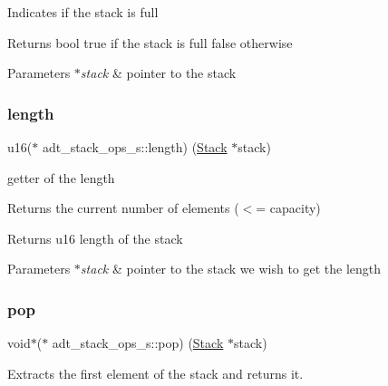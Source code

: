 Indicates if the stack is full

\begin{DoxyReturn}{Returns}
bool true if the stack is full false otherwise 
\end{DoxyReturn}

\begin{DoxyParams}{Parameters}
{\em $\ast$stack} & pointer to the stack \\
\hline
\end{DoxyParams}
\mbox{\label{structadt__stack__ops__s_ae77aa49422bbfe038dd3f9eb93e14882}} 
\subsubsection{\texorpdfstring{length}{length}}
{\footnotesize\ttfamily u16($\ast$ adt\+\_\+stack\+\_\+ops\+\_\+s\+::length) (\hyperlink{structadt__stack__s}{Stack} $\ast$stack)}



getter of the length 

Returns the current number of elements ($<$= capacity)

\begin{DoxyReturn}{Returns}
u16 length of the stack 
\end{DoxyReturn}

\begin{DoxyParams}{Parameters}
{\em $\ast$stack} & pointer to the stack we wish to get the length \\
\hline
\end{DoxyParams}
\mbox{\label{structadt__stack__ops__s_a86683f4cd4288e5ed0eeea63f1e70b34}} 
\subsubsection{\texorpdfstring{pop}{pop}}
{\footnotesize\ttfamily void$\ast$($\ast$ adt\+\_\+stack\+\_\+ops\+\_\+s\+::pop) (\hyperlink{structadt__stack__s}{Stack} $\ast$stack)}



Extracts the first element of the stack and returns it. 


